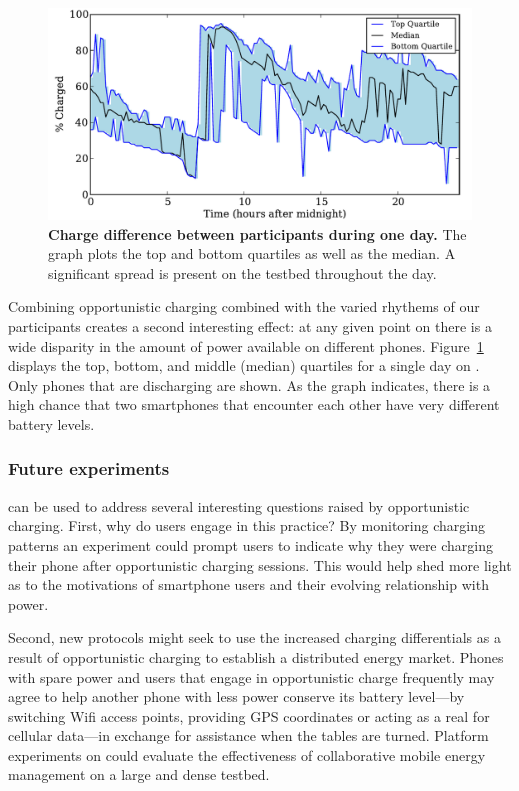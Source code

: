\begin{figure}[t]
\includegraphics[width=\textwidth]{./figures/power/opportunistic_charging/max_difference/graph.pdf}
\caption{\textbf{Charge difference between participants during one day.} The
graph plots the top and bottom quartiles as well as the median. A significant
spread is present on the testbed throughout the day.}
\label{fig-opportunisticspread}
\end{figure}

Combining opportunistic charging combined with the varied rhythems of our
participants creates a second interesting effect: at any given point on
\PhoneLab{} there is a wide disparity in the amount of power available on
different phones. Figure~\ref{fig-opportunisticspread} displays the top,
bottom, and middle (median) quartiles for a single day on \PhoneLab{}. Only
phones that are discharging are shown. As the graph indicates, there is a
high chance that two smartphones that encounter each other have very
different battery levels.

\subsubsection{Future experiments}

\PhoneLab{} can be used to address several interesting questions raised by
opportunistic charging. First, why do users engage in this practice? By
monitoring charging patterns an experiment could prompt users to indicate why
they were charging their phone after opportunistic charging sessions. This
would help shed more light as to the motivations of smartphone users and
their evolving relationship with power.

Second, new protocols might seek to use the increased charging differentials
as a result of opportunistic charging to establish a distributed energy
market. Phones with spare power and users that engage in opportunistic charge
frequently may agree to help another phone with less power conserve its
battery level---by switching Wifi access points, providing GPS coordinates or
acting as a real for cellular data---in exchange for assistance when the
tables are turned. Platform experiments on \PhoneLab{} could evaluate the
effectiveness of collaborative mobile energy management on a large and dense
testbed.

